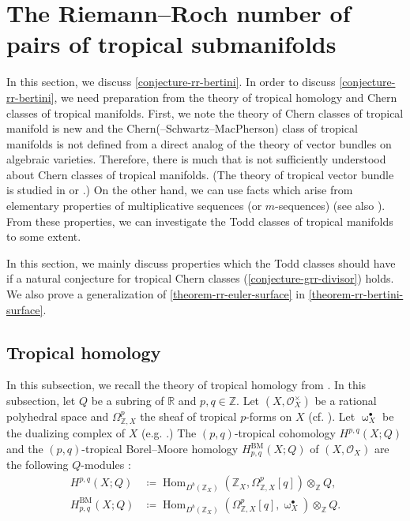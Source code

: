 \documentclass[a4paper,dvipdfmx,reqno,12pt]{amsart}
\theoremstyle{definition}
\newcommand{\deq}{\coloneqq}
\newcommand{\opn}[1]{\operatorname{#1}}
\numberwithin{equation}{section}
\begin{document}
\section{The Riemann--Roch number of pairs of
tropical submanifolds}
\label{section-on-rr-bertini}
In this section, we discuss \cref{conjecture-rr-bertini}.
In order to discuss \cref{conjecture-rr-bertini},
we need preparation from the theory of tropical homology
and Chern classes of tropical manifolds.
First, we note 
the theory of Chern classes of tropical manifold
\cite{demedrano2023chern} is new and 
the Chern(--Schwartz--MacPherson) class of
tropical manifolds is not defined from a direct analog
of the theory of vector bundles on algebraic varieties.
Therefore, there is much that is not sufficiently
understood about Chern classes of tropical manifolds.
(The theory of tropical vector bundle is studied
in \cite{MR2961320,MR4646329} or 
\cite[Theorem 1.8]{amini2020hodge}.)
On the other hand, we can use facts 
which arise from elementary properties of
multiplicative sequences (or $m$-sequences)
\cite[]{MR1335917}
(see also \cite[]{MR440554}).
From these properties,
we can investigate the Todd classes
of tropical manifolds to some extent.

In this section, we mainly
discuss properties which 
the Todd classes should have if
a natural conjecture for
tropical Chern classes
(\cref{conjecture-grr-divisor}) holds.
We also prove a generalization of 
\cref{theorem-rr-euler-surface}
in \cref{theorem-rr-bertini-surface}.

\subsection{Tropical homology}
In this subsection, we recall
the theory of tropical homology from
\cite{MR3330789,MR3894860,MR4637248}.
In this subsection, let
$Q$ be a subring of $\mathbb{R}$
and $p,q\in \mathbb{Z}$.
Let $(X,\mathcal{O}_X^{\times})$ be
a rational polyhedral space and 
$\Omega_{\mathbb{Z},X}^{p}$
the sheaf of tropical $p$-forms
on $X$ \cite[Definition 2.7]{MR4637248}
(cf. \cite[]{MR3330789}).
Let $\upomega_{X}^{\bullet}$ be
the dualizing complex of $X$
(e.g. \cite[Definition 3.1.16]{MR1299726}.)
The $(p,q)$-tropical cohomology
$H^{p,q}(X;Q)$ and 
the $(p,q)$-tropical Borel--Moore homology
$H_{p,q}^{\mathrm{BM}}(X;Q)$ of $(X,\mathcal{O}_X)$
are the following $Q$-modules
\cite[Definition 4.1 and 4.3]{MR4637248}:
\begin{align}
H^{p,q}(X;Q)&\deq \opn{Hom}_{D^{b}(\mathbb{Z}_X)}(
\mathbb{Z}_X,\Omega_{\mathbb{Z},X}^{p}[q])
\otimes_{\mathbb{Z}} Q, \\
H_{p,q}^{\mathrm{BM}}(X;Q)
&\deq \opn{Hom}_{D^{b}(\mathbb{Z}_X)}
(\Omega_{\mathbb{Z},X}^{p}[q],\upomega_{X}^{\bullet})
\otimes_{\mathbb{Z}}Q.
\end{align}
\end{document}
